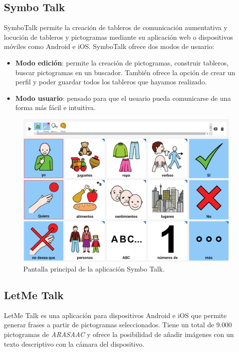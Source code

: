 \subsection{Symbo Talk}

SymboTalk permite la creación de tableros de comunicación aumentativa y locución de tableros y pictogramas mediante su aplicación web o dispositivos móviles como Android e iOS.
\newpage
SymboTalk ofrece dos modos de usuario:

\begin{itemize}
	\item \textbf{Modo edición}: permite la creación de pictogramas, construir tableros, buscar pictogramas en un buscador. También ofrece la opción de crear un perfil y poder guardar todos los tableros que hayamos realizado.
	
	\item \textbf{Modo usuario}: pensado para que el usuario pueda comunicarse de una forma más fácil e intuitiva.
	
\end{itemize}

\begin{figure}[h!]
	\centering
	\includegraphics[width=0.7\linewidth]{Imagenes/Bitmap/SymboTalk}
	\caption{Pantalla principal de la aplicación Symbo Talk.}
	\label{fig:symbotalk}
\end{figure}

\newpage
\subsection{LetMe Talk}

LetMe Talk es una aplicación para dispositivos Android e iOS que permite generar frases a partir de pictogramas seleccionados. Tiene un total de 9.000 pictogramas de \textit{ARASAAC} y ofrece la posibilidad de añadir imágenes con un texto descriptivo con la cámara del dispositivo.


